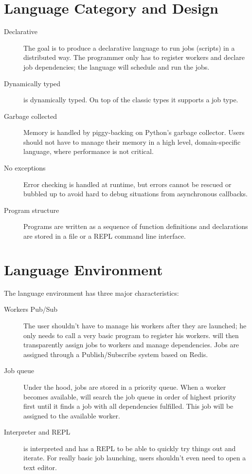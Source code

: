 \section{Language Category and Design}
\label{sect:desg}
\begin{description}
\item[Declarative] The goal is to produce a declarative language to run jobs
(scripts) in a distributed way. The programmer only has to register workers and
declare job dependencies; the language will schedule and run the jobs.
\item[Dynamically typed] \lang{} is dynamically typed.
On top of the classic types it supports a job type.
\item[Garbage collected] Memory is handled by piggy-backing on
Python's garbage collector. Users should not have to manage their memory in a high level, domain-specific language, where performance is not critical.
\item[No exceptions] Error checking is handled at runtime, but errors cannot be rescued or bubbled up to avoid hard to debug situations from asynchronous callbacks.
\item[Program structure] Programs are written as a sequence of function
definitions and declarations are stored in a file or a REPL command line
interface.
\end{description}

\section{Language Environment}
\label{sect:tech}
The language environment has three major characteristics:
\begin{description}
\item[Workers Pub/Sub] The user shouldn't have to manage his workers after
they are launched; he only needs to call a very basic program
to register his workers. \lang{} will then transparently assign jobs to workers
and manage dependencies. Jobs are assigned through a Publish/Subscribe system
based on Redis.
\item[Job queue] Under the hood, jobs are stored in a priority queue. When a
worker becomes available, \lang{} will search the job queue in order of highest
priority first until it finds a job with all dependencies fulfilled. This job
will be assigned to the available worker.
\item[Interpreter and REPL] \lang{} is interpreted and has a REPL to be able to
quickly try things out and iterate. For really basic job launching, users shouldn't even need to open a text editor.
\end{description}


